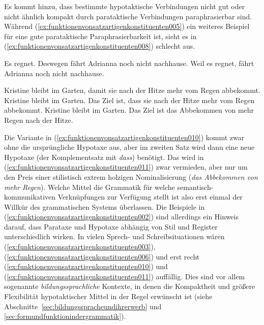 Es kommt hinzu, dass bestimmte hypotaktische Verbindungen nicht gut oder nicht ähnlich kompakt durch parataktische Verbindungen paraphrasierbar sind.
Während (\ref{ex:funktionenvonsatzartigenkonstituenten005}) ein weiteres Beispiel für eine gute parataktische Paraphrasierbarkeit ist, sieht es in (\ref{ex:funktionenvonsatzartigenkonstituenten008}) schlecht aus.

\begin{exe}
  \ex\label{ex:funktionenvonsatzartigenkonstituenten005}
  \begin{xlist}
    \ex\label{ex:funktionenvonsatzartigenkonstituenten006} Es regnet. Deswegen fährt Adrianna noch nicht nachhause.
    \ex\label{ex:funktionenvonsatzartigenkonstituenten007} Weil es regnet, fährt Adrianna noch nicht nachhause.
  \end{xlist}
  \ex\label{ex:funktionenvonsatzartigenkonstituenten008}
  \begin{xlist}
    \ex\label{ex:funktionenvonsatzartigenkonstituenten009} Kristine bleibt im Garten, damit sie nach der Hitze mehr vom Regen abbekommt.
    \ex\label{ex:funktionenvonsatzartigenkonstituenten010} Kristine bleibt im Garten. Das Ziel ist, dass sie nach der Hitze mehr vom Regen abbekommt.
    \ex\label{ex:funktionenvonsatzartigenkonstituenten011} Kristine bleibt im Garten. Das Ziel ist das Abbekommen von mehr Regen nach der Hitze.
  \end{xlist}
\end{exe}

Die Variante in (\ref{ex:funktionenvonsatzartigenkonstituenten010}) kommt zwar ohne die ursprüngliche Hypotaxe aus, aber im zweiten Satz wird dann eine neue Hypotaxe (der Komplementsatz mit \textit{dass}) benötigt.
Das wird in (\ref{ex:funktionenvonsatzartigenkonstituenten011}) zwar vermieden, aber nur um den Preis einer stilistisch extrem holzigen Nominalisierung (\textit{das Abbekommen von mehr Regen}).
Welche Mittel die Grammatik für welche semantisch-kommunikativen Verknüpfungen zur Verfügung stellt ist also erst einmal der Willkür des grammatischen Systems überlassen.
Die Beispiele in (\ref{ex:funktionenvonsatzartigenkonstituenten002}) sind allerdings ein Hinweis darauf, dass Parataxe und Hypotaxe abhängig von Stil und Register unterschiedlich wirken.
In vielen Sprech- und Schreibsituationen wären (\ref{ex:funktionenvonsatzartigenkonstituenten003}), (\ref{ex:funktionenvonsatzartigenkonstituenten006}) und erst recht (\ref{ex:funktionenvonsatzartigenkonstituenten010}) und (\ref{ex:funktionenvonsatzartigenkonstituenten011}) auffällig.
Dies sind vor allem sogenannte \textit{bildungssprachliche} Kontexte, in denen die Kompaktheit und größere Flexibilität hypotaktischer Mittel in der Regel erwünscht ist (siehe Abschnitte~\ref{sec:bildungsspracheundihrerwerb} und \ref{sec:formundfunktionindergrammatik}).


